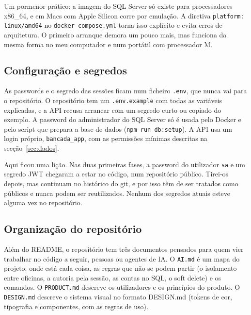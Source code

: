\documentclass[a4paper,12pt]{article}
\begin{document}
Um pormenor prático: a imagem do SQL Server só existe para processadores x86\_64, e em Macs com Apple Silicon corre por emulação. A diretiva \texttt{platform: linux/amd64} no \texttt{docker-compose.yml} torna isso explícito e evita erros de arquitetura. O primeiro arranque demora um pouco mais, mas funciona da mesma forma no meu computador e num portátil com processador M.

\subsection{Configuração e segredos}

As passwords e o segredo das sessões ficam num ficheiro \texttt{.env}, que nunca vai para o repositório. O repositório tem um \texttt{.env.example} com todas as variáveis explicadas, e a \ac{API} recusa arrancar com um segredo curto ou copiado do exemplo. A password do administrador do SQL Server só é usada pelo Docker e pelo script que prepara a base de dados (\texttt{npm run db:setup}). A \ac{API} usa um login próprio, \texttt{bancada\_app}, com as permissões mínimas descritas na secção~\ref{sec:dados}.

Aqui ficou uma lição. Nas duas primeiras fases, a password do utilizador \texttt{sa} e um segredo \ac{JWT} chegaram a estar no código, num repositório público. Tirei-os depois, mas continuam no histórico do git, e por isso têm de ser tratados como públicos e nunca podem ser reutilizados. Nenhum dos segredos atuais esteve alguma vez no repositório.

\subsection{Organização do repositório}


\vspace{0.5em}
Além do README, o repositório tem três documentos pensados para quem vier trabalhar no código a seguir, pessoas ou agentes de IA. O \texttt{AI.md} é um mapa do projeto: onde está cada coisa, as regras que não se podem partir (o isolamento entre oficinas, a autoria pela sessão, as contas no SQL, o soft delete) e os comandos. O \texttt{PRODUCT.md} descreve os utilizadores e os princípios do produto. O \texttt{DESIGN.md} descreve o sistema visual no formato DESIGN.md (tokens de cor, tipografia e componentes, com as regras de uso).
\end{document}
